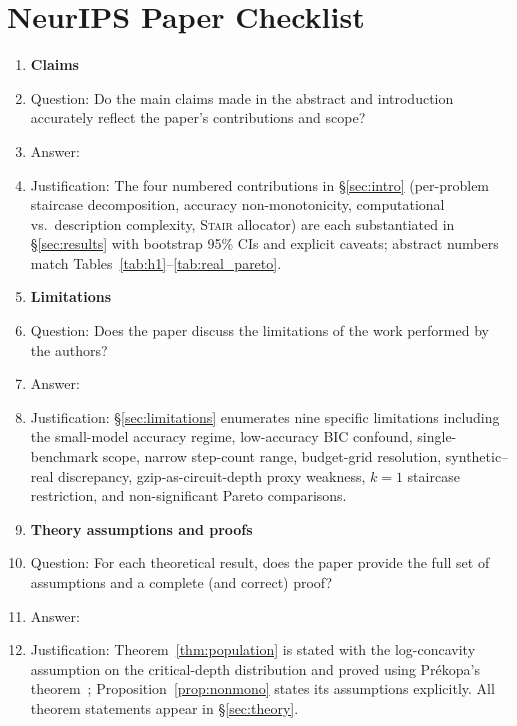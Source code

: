 \documentclass{article}
\newcommand{\method}{\textsc{Stair}}
\begin{document}
\newpage
\section*{NeurIPS Paper Checklist}

\begin{enumerate}

\item {\bf Claims}
    \item[] Question: Do the main claims made in the abstract and introduction accurately reflect the paper's contributions and scope?
    \item[] Answer: \answerYes{}
    \item[] Justification: The four numbered contributions in \S\ref{sec:intro} (per-problem staircase decomposition, accuracy non-monotonicity, computational vs.\ description complexity, \method{} allocator) are each substantiated in \S\ref{sec:results} with bootstrap 95\% CIs and explicit caveats; abstract numbers match Tables~\ref{tab:h1}--\ref{tab:real_pareto}.

\item {\bf Limitations}
    \item[] Question: Does the paper discuss the limitations of the work performed by the authors?
    \item[] Answer: \answerYes{}
    \item[] Justification: \S\ref{sec:limitations} enumerates nine specific limitations including the small-model accuracy regime, low-accuracy BIC confound, single-benchmark scope, narrow step-count range, budget-grid resolution, synthetic--real discrepancy, gzip-as-circuit-depth proxy weakness, $k{=}1$ staircase restriction, and non-significant Pareto comparisons.

\item {\bf Theory assumptions and proofs}
    \item[] Question: For each theoretical result, does the paper provide the full set of assumptions and a complete (and correct) proof?
    \item[] Answer: \answerYes{}
    \item[] Justification: Theorem~\ref{thm:population} is stated with the log-concavity assumption on the critical-depth distribution and proved using Pr\'ekopa's theorem~\citep{prekopa1973logconcave}; Proposition~\ref{prop:nonmono} states its assumptions explicitly. All theorem statements appear in \S\ref{sec:theory}.


\end{enumerate}
\end{document}
